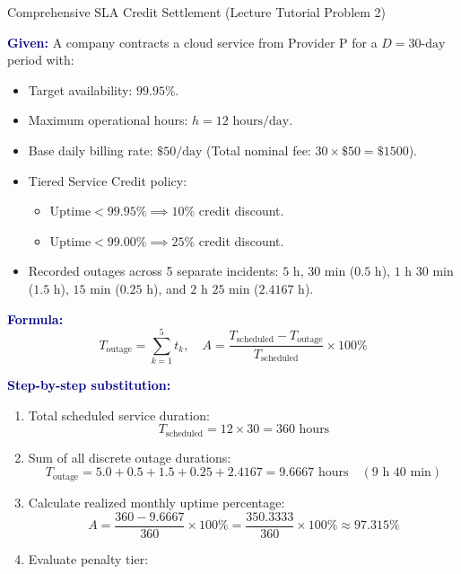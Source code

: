 \documentclass[11pt,a4paper,openany]{report}
\newcommand{\Given}{\par\textbf{\textcolor{navy}{Given:}} }
\newcommand{\Formula}{\par\textbf{\textcolor{navy}{Formula:}} }
\newcommand{\Steps}{\par\textbf{\textcolor{navy}{Step-by-step substitution:}}\par}
\begin{document}
\begin{solved}{Comprehensive SLA Credit Settlement (Lecture Tutorial Problem 2)}
\Given A company contracts a cloud service from Provider P for a $D = 30\text{-day}$ period with:
\begin{itemize}
  \item Target availability: $99.95\%$.
  \item Maximum operational hours: $h = 12\text{ hours/day}$.
  \item Base daily billing rate: $\$50/\text{day}$ (Total nominal fee: $30 \times \$50 = \$1500$).
  \item Tiered Service Credit policy:
    \begin{itemize}
      \item $\text{Uptime} < 99.95\% \implies 10\%$ credit discount.
      \item $\text{Uptime} < 99.00\% \implies 25\%$ credit discount.
    \end{itemize}
  \item Recorded outages across 5 separate incidents:
    $5\text{ h}$, $30\text{ min}$ ($0.5\text{ h}$), $1\text{ h } 30\text{ min}$ ($1.5\text{ h}$), $15\text{ min}$ ($0.25\text{ h}$), and $2\text{ h } 25\text{ min}$ ($2.4167\text{ h}$).
\end{itemize}
\Formula
\begin{equation}
T_{\text{outage}} = \sum_{k=1}^{5} t_k, \quad A = \frac{T_{\text{scheduled}} - T_{\text{outage}}}{T_{\text{scheduled}}} \times 100\%
\end{equation}
\Steps
\begin{enumerate}[leftmargin=*]
  \item Total scheduled service duration:
  \begin{equation}
  T_{\text{scheduled}} = 12 \times 30 = 360\text{ hours}
  \end{equation}
  \item Sum of all discrete outage durations:
  \begin{equation}
  T_{\text{outage}} = 5.0 + 0.5 + 1.5 + 0.25 + 2.4167 = 9.6667\text{ hours} \quad (9\text{ h } 40\text{ min})
  \end{equation}
  \item Calculate realized monthly uptime percentage:
  \begin{equation}
  A = \frac{360 - 9.6667}{360} \times 100\% = \frac{350.3333}{360} \times 100\% \approx 97.315\%
  \end{equation}
  \item Evaluate penalty tier:

\end{enumerate}
\end{solved}
\end{document}
